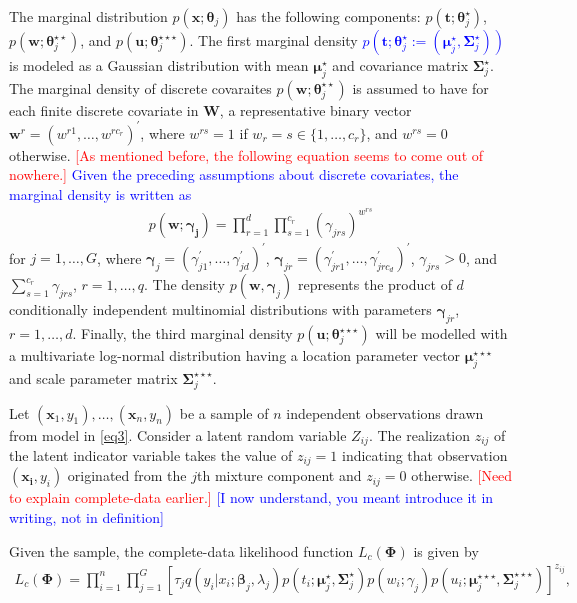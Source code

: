 \documentclass[11pt,letterpaper]{article}
\numberwithin{equation}{section}
\numberwithin{equation}{section}
\numberwithin{equation}{section}
\begin{document}
The marginal distribution $p(\bm{x}; \bm \theta_j)$ has the following components: $p(\bm{t}; \bm \theta_j^{\star})$, $p(\bm{w}; \bm \theta_j^{\star\star})$, and $p(\bm{u};\bm \theta_{j}^{\star\star\star})$. The first marginal density \textcolor{blue}{ $p(\bm{t}; \bm \theta_j^{\star}:=( \bm {\mu}_j^{\star}, \bm{\Sigma}_j^{\star}) )$} is modeled as a  Gaussian distribution with mean $\bm {\mu}_j^{\star}$ and covariance matrix $\bm{\Sigma}_j^{\star}$. 
 The marginal density of discrete covaraites $p(\bm{w};\bm{\theta}_{j}^{\star\star})$ is assumed to have for each finite discrete covariate in $\bm{W}$, a representative binary vector $\bm{w}^r=(w^{r1},\ldots,w^{rc_r})^{'}$, where $w^{rs}=1$ if $w_r = s\in\{1, \ldots, c_r\}$, %
and $w^{rs}=0$ otherwise.
\textcolor{red}{[As mentioned before, the following equation seems to come out of nowhere.]}
\textcolor{blue}{Given the preceding assumptions about discrete covariates, the marginal density is written as}
\begin{align}
p(\bm {w}; \bm {\gamma_j})=\prod_{r=1}^{d}\prod_{s=1}^{c_r}(\gamma_{jrs} )^{w^{rs}}
\label{eq31}
\end{align}
for $j=1, \ldots, G$, where $\bm {\gamma}_j=(\gamma_{j1}^{'}, \ldots, \gamma_{jd}^{'})^{'}$, $\bm \gamma_{jr}=(\gamma_{jr1}^{'}, \ldots, \gamma_{jrc_d}^{'})^{'}$, $\gamma_{jrs} > 0$, and  $\sum_{s=1}^{c_r}\gamma_{jrs}$, $r=1,\ldots,q$. The density $p(\bm {w}, \bm{\gamma}_j)$ represents the product of $d$ conditionally independent multinomial distributions with parameters $\bm{\gamma}_{jr}$, $r=1,\ldots, d$. Finally, the third marginal density $p(\bm{u};\bm{\theta}_{j}^{\star\star\star})$ will be modelled with a multivariate log-normal distribution having a location parameter vector $ \bm{\mu}_j^{\star\star\star}$ and scale parameter matrix $\bm{\Sigma}_j^{\star\star\star} $.

Let $(\bm x_1, y_1),\ldots, (\bm x_n, y_n)$ be a sample of $n$ independent observations drawn from model in \eqref{eq3}. Consider a latent random variable $Z_{ij}$.  The realization $z_{ij}$ of the latent indicator variable takes the value of $z_{ij}=1$ indicating that observation $(\bm{x_i}, y_i)$ originated from the $j$th mixture component and $z_{ij}=0$ otherwise.
 \textcolor{red}{[Need to explain complete-data earlier.]}  \textcolor{blue}{[I now understand, you meant introduce it in writing, not in definition]}

 Given the sample, the complete-data likelihood function $L_c(\bm\Phi)$ is given by
\begin{align}
L_c(\bm\Phi)=\prod_{i=1}^{n}\prod_{j=1}^{G}\left[{\tau_j}q(y_i|x_i; \bm \beta_j, \lambda_{j})p(t_i; \bm\mu_j^{\star}, \bm\Sigma_j^{\star}) p(w_i; \gamma_j)p(u_i; \bm{\mu}_j^{\star\star\star},\bm{\Sigma}_j^{\star\star\star}) \right]^{z_{ij}},
\label{eq27}
\end{align}
\end{document}
